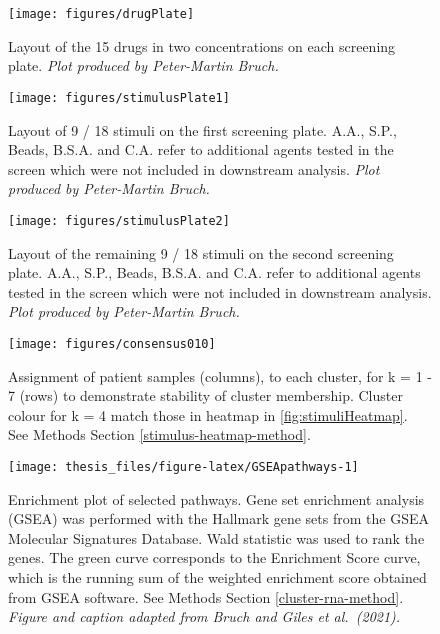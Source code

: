 \documentclass[11pt, a4paper, twosided]{book}
\begin{document}
\begin{figure}

{\centering \texttt{[image: figures/drugPlate]} 

}

\caption{Layout of the 15 drugs in two concentrations on each screening plate. \emph{Plot produced by Peter-Martin Bruch.}}\label{fig:drugPlot}
\end{figure}

\begin{figure}

{\centering \texttt{[image: figures/stimulusPlate1]} 

}

\caption{Layout of 9 / 18 stimuli on the first screening plate. A.A., S.P., Beads, B.S.A. and C.A. refer to additional agents tested in the screen which were not included in downstream analysis. \emph{Plot produced by Peter-Martin Bruch.}}\label{fig:stimulusPlot1}
\end{figure}

\begin{figure}

{\centering \texttt{[image: figures/stimulusPlate2]} 

}

\caption{Layout of the remaining 9 / 18 stimuli on the second screening plate. A.A., S.P., Beads, B.S.A. and C.A. refer to additional agents tested in the screen which were not included in downstream analysis. \emph{Plot produced by Peter-Martin Bruch.}}\label{fig:stimulusPlot2}
\end{figure}

\begin{figure}

{\centering \texttt{[image: figures/consensus010]} 

}

\caption{Assignment of patient samples (columns), to each cluster, for k = 1 - 7 (rows) to demonstrate stability of cluster membership. Cluster colour for k = 4 match those in heatmap in \ref{fig:stimuliHeatmap}. See Methods Section \ref{stimulus-heatmap-method}.}\label{fig:consensusClusteringB}
\end{figure}

\begin{figure}

{\centering \texttt{[image: thesis\_files/figure-latex/GSEApathways-1]} 

}

\caption{Enrichment plot of selected pathways. Gene set enrichment analysis (GSEA) was performed with the Hallmark gene sets from the GSEA Molecular Signatures Database. Wald statistic was used to rank the genes. The green curve corresponds to the Enrichment Score curve, which is the running sum of the weighted enrichment score obtained from GSEA software. See Methods Section \ref{cluster-rna-method}. \emph{Figure and caption adapted from Bruch and Giles et al.~(2021).}}\label{fig:GSEApathways}
\end{figure}
\end{document}
